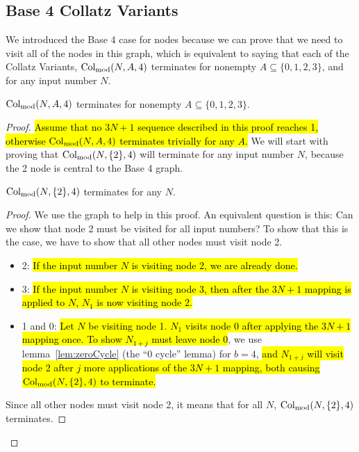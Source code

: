 \subsection{Base 4 Collatz Variants} \label{subsubsec:base4variants}
We introduced the Base 4 case for nodes because we can prove that we need to visit all of the nodes in this graph, which is equivalent to saying that each of the Collatz Variants, $\mathrm{Col}_{\text{mod}}(N,A,4)$ terminates for nonempty $A \subseteq \{0,1,2,3\}$, and for any input number $N$. 
\begin{theorem}
$\mathrm{Col}_{\text{mod}}(N,A,4)$ terminates for nonempty $A \subseteq \{0,1,2,3\}$.
\end{theorem}
\begin{proof}
\hl{Assume that no $3N+1$ sequence described in this proof reaches 1, otherwise $\mathrm{Col}_{\text{mod}}(N,A,4)$ terminates trivially for any $A$.} We will start with proving that $\mathrm{Col}_{\text{mod}}(N,\{2\},4)$ will terminate for any input number $N$, because the 2 node is central to the Base 4 graph.  \par
\begin{lemma}
\label{lem:collatzSubTwoModFour}
$\mathrm{Col}_{\text{mod}}(N,\{2\},4)$ terminates for any $N$.
\end{lemma} 
\begin{proof}
We use the graph to help in this proof. An equivalent question is this: Can we show that node 2 must be visited for all input numbers? To show that this is the case, we have to show that all other nodes must visit node 2.
\begin{itemize}
    \item 2: \hl{If the input number $N$ is visiting node 2, we are already done.}
    \item 3: \hl{If the input number $N$ is visiting node 3, then after the $3N+1$ mapping is applied to $N$, $N_1$ is now visiting node 2.}
    \item 1 and 0: \hl{Let $N$ be visiting node 1. $N_1$ visits node 0 after applying the $3N+1$ mapping once. To show $N_{1+j}$ must leave node 0}, we use lemma~\ref{lem:zeroCycle} (the ``0 cycle'' lemma) for $b = 4$, \hl{and $N_{1+j}$ will visit node 2 after $j$ more applications of the $3N+1$ mapping, both causing $\mathrm{Col}_{\text{mod}}(N,\{2\},4)$ to terminate.}
\end{itemize}
Since all other nodes must visit node 2, it means that for all $N$, $\mathrm{Col}_{\text{mod}}(N,\{2\},4)$ terminates.
\end{proof} \par


\end{proof}
